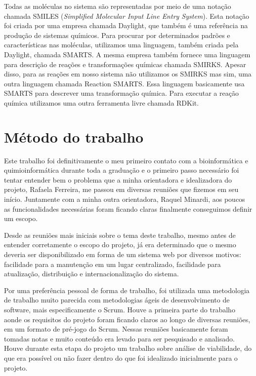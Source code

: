 \documentclass{abnt}
\begin{document}
Todas as moléculas no sistema são representadas por meio de uma notação chamada
SMILES (\textit{Simplified Molecular Input Line Entry System})\cite{DL_SMILES}. Esta notação foi criada
por uma empresa chamada Daylight, que também é uma referência na produção de sistemas
químicos. Para procurar por determinados padrões e características nas moléculas,
utilizamos uma linguagem, também criada pela Daylight, chamada SMARTS\cite{DL_SMARTS}. A mesma empresa
também fornece uma linguagem para descrição de reações e transformações químicas
chamada SMIRKS\cite{DL_SMIRKS}. Apesar disso, para as reações em nosso sistema não utilizamos os
SMIRKS mas sim, uma outra linguagem chamada Reaction SMARTS. Essa linguagem basicamente
usa SMARTS para descrever uma transformação química. Para executar a reação química
utilizamos uma outra ferramenta livre chamada RDKit\cite{RDKIT}.

\chapter{Método do trabalho}

Este trabalho foi definitivamente o meu primeiro contato com a bioinformática e quimioinformática
durante toda a graduação e o primeiro passo necessário foi tentar entender bem o
problema que a minha orientadora e idealizadora do projeto, Rafaela Ferreira, me
passou em diversas reuniões que fizemos em seu início. Juntamente com a minha
outra orientadora, Raquel Minardi, aos poucos as funcionalidades necessárias foram
ficando claras finalmente conseguimos definir um escopo.

Desde as reuniões mais iniciais sobre o tema deste trabalho, mesmo antes de entender
corretamente o escopo do projeto, já era determinado que o mesmo deveria ser disponibilizado
em forma de um sistema web por diversos motivos: facilidade para a manutenção em
um lugar centralizado, facilidade para atualização, distribuição e internacionalização
do sistema.

Por uma preferência pessoal de forma de trabalho, foi utilizada uma metodologia
de trabalho muito parecida com metodologias ágeis de desenvolvimento de software\cite{alliance2001agile},
mais especificamente o Scrum\cite{schwaber2011scrum}. Houve a primeira parte do trabalho aonde os requisitos
do projeto foram ficando claros ao longo de diversas reuniões, em um formato de
pré-jogo do Scrum. Nessas reuniões basicamente foram tomadas notas e muito conteúdo
era levado para ser pesquisado e analisado. Houve durante esta etapa do projeto
um trabalho sobre análise de viabilidade, do que era possível ou não fazer dentro
do que foi idealizado inicialmente para o projeto.
\end{document}
